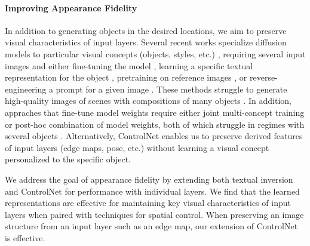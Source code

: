 \paragraph{Improving Appearance Fidelity}
In addition to generating objects in the desired locations, we aim to preserve visual characteristics of input layers. 
Several recent works specialize diffusion models to particular visual concepts (objects, styles, etc.) \cite{TextualInversion,Dreambooth,CustomDiffusion}, requiring several input images and either fine-tuning the model \cite{Dreambooth,CustomDiffusion}, learning a specific textual representation for the object \cite{TextualInversion}, pretraining on reference images \cite{xiao2023fastcomposer}, or reverse-engineering a prompt for a given image \cite{PEZ}. 
These methods struggle to generate high-quality images of scenes with compositions of many objects \cite{TextualInversion,Dreambooth,CustomDiffusion,xiao2023fastcomposer}.
In addition, appraches that fine-tune model weights require either joint multi-concept training or post-hoc combination of model weights, both of which struggle in regimes with several objects \cite{Dreambooth,CustomDiffusion}.
Alternatively, ControlNet \cite{zhang2023adding} enables us to preserve derived features of input layers (edge maps, pose, etc.) without learning a visual concept personalized to the specific object. 

We address the goal of appearance fidelity by extending both textual inversion \cite{TextualInversion} and ControlNet \cite{zhang2023adding} for performance with individual layers. 
We find that the learned representations are effective for maintaining key visual characteristics of input layers when paired with techniques for spatial control. 
When preserving an image structure from an input layer such as an edge map, our extension of ControlNet is effective. 
\vspace{-1.5em}

